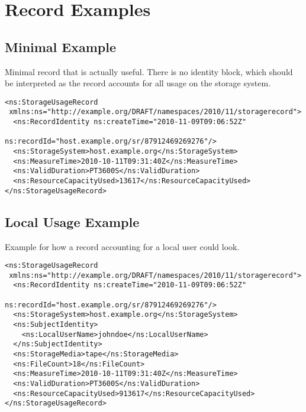 
\section{Record Examples}
\label{sec:record-examples}


\subsection{Minimal Example}

Minimal record that is actually useful. There is no identity block, which should 
be interpreted as the record accounts for all usage on the storage
system.

\begin{verbatim}
<ns:StorageUsageRecord
 xmlns:ns="http://example.org/DRAFT/namespaces/2010/11/storagerecord">
  <ns:RecordIdentity ns:createTime="2010-11-09T09:06:52Z"
                     ns:recordId="host.example.org/sr/87912469269276"/>
  <ns:StorageSystem>host.example.org</ns:StorageSystem>
  <ns:MeasureTime>2010-10-11T09:31:40Z</ns:MeasureTime>
  <ns:ValidDuration>PT3600S</ns:ValidDuration>
  <ns:ResourceCapacityUsed>13617</ns:ResourceCapacityUsed>
</ns:StorageUsageRecord>
\end{verbatim}

\subsection{Local Usage Example}

Example for how a record accounting for a local user could look.
\begin{verbatim}
<ns:StorageUsageRecord
 xmlns:ns="http://example.org/DRAFT/namespaces/2010/11/storagerecord">
  <ns:RecordIdentity ns:createTime="2010-11-09T09:06:52Z"
                     ns:recordId="host.example.org/sr/87912469269276"/>
  <ns:StorageSystem>host.example.org</ns:StorageSystem>
  <ns:SubjectIdentity>
    <ns:LocalUserName>johndoe</ns:LocalUserName>
  </ns:SubjectIdentity>
  <ns:StorageMedia>tape</ns:StorageMedia>
  <ns:FileCount>18</ns:FileCount>
  <ns:MeasureTime>2010-10-11T09:31:40Z</ns:MeasureTime>
  <ns:ValidDuration>PT3600S</ns:ValidDuration>
  <ns:ResourceCapacityUsed>913617</ns:ResourceCapacityUsed>
</ns:StorageUsageRecord>
\end{verbatim}

